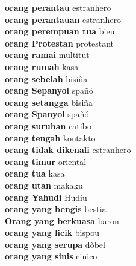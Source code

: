 \textbf{ orang perantau  } estranhero \\
\textbf{ orang perantauan  } estranhero \\
\textbf{ orang perempuan tua  } bieu \\
\textbf{ orang Protestan  } protestant \\
\textbf{ orang ramai  } multitut \\
\textbf{ orang rumah  } kasa \\
\textbf{ orang sebelah  } bisiña \\
\textbf{ orang Sepanyol  } spañó \\
\textbf{ orang setangga  } bisiña \\
\textbf{ orang Spanyol  } spañó \\
\textbf{ orang suruhan  } catibo \\
\textbf{ orang tengah  } kontakto \\
\textbf{ orang tidak dikenali  } estranhero \\
\textbf{ orang timur  } oriental \\
\textbf{ orang tua  } kasa \\
\textbf{ orang utan  } makaku \\
\textbf{ orang Yahudi  } Hudiu \\
\textbf{ orang yang bengis  } bestia \\
\textbf{ Orang yang berkuasa  } baron \\
\textbf{ orang yang licik  } bispou \\
\textbf{ orang yang serupa  } dòbel \\
\textbf{ orang yang sinis  } cinico \\
